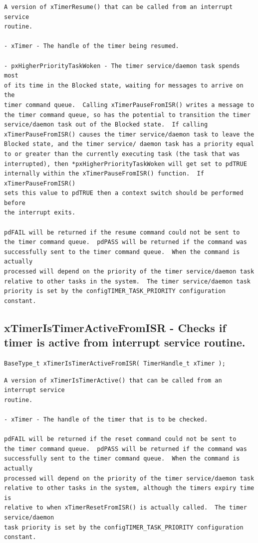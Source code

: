 \begin{lstlisting}
A version of xTimerResume() that can be called from an interrupt service
routine.

- xTimer - The handle of the timer being resumed.

- pxHigherPriorityTaskWoken - The timer service/daemon task spends most
of its time in the Blocked state, waiting for messages to arrive on the
timer command queue.  Calling xTimerPauseFromISR() writes a message to
the timer command queue, so has the potential to transition the timer
service/daemon task out of the Blocked state.  If calling
xTimerPauseFromISR() causes the timer service/daemon task to leave the
Blocked state, and the timer service/ daemon task has a priority equal
to or greater than the currently executing task (the task that was
interrupted), then *pxHigherPriorityTaskWoken will get set to pdTRUE
internally within the xTimerPauseFromISR() function.  If xTimerPauseFromISR()
sets this value to pdTRUE then a context switch should be performed before
the interrupt exits.

pdFAIL will be returned if the resume command could not be sent to
the timer command queue.  pdPASS will be returned if the command was
successfully sent to the timer command queue.  When the command is actually
processed will depend on the priority of the timer service/daemon task
relative to other tasks in the system.  The timer service/daemon task
priority is set by the configTIMER_TASK_PRIORITY configuration constant.

\end{lstlisting}
\subsection{xTimerIsTimerActiveFromISR -  Checks if timer is active from interrupt service routine.}
\label{rt_cmd:xTimerIsTimerActiveFromISR}

\begin{verbatim}
BaseType_t xTimerIsTimerActiveFromISR( TimerHandle_t xTimer );
\end{verbatim}
\begin{lstlisting}
A version of xTimerIsTimerActive() that can be called from an interrupt service
routine.

- xTimer - The handle of the timer that is to be checked.

pdFAIL will be returned if the reset command could not be sent to
the timer command queue.  pdPASS will be returned if the command was
successfully sent to the timer command queue.  When the command is actually
processed will depend on the priority of the timer service/daemon task
relative to other tasks in the system, although the timers expiry time is
relative to when xTimerResetFromISR() is actually called.  The timer service/daemon
task priority is set by the configTIMER_TASK_PRIORITY configuration constant.

\end{lstlisting}
